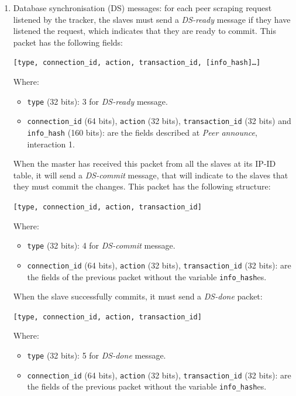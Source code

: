 \documentclass[twoside,a4paper,10pt]{article}
\begin{document}
\begin{itemize}
\begin{enumerate}
  \item Database synchronisation (DS) messages: for each peer scraping request
    listened by the tracker, the slaves must send a \emph{DS-ready} message
    if they have listened
    the request, which  indicates that they are ready to commit.
    This packet has the
    following fields:

    \texttt{[type, connection\_id, action, transaction\_id, [info\_hash]\ldots]}

    Where:
    \begin{itemize}
    \item \texttt{type} (32 bits): 3 for \emph{DS-ready} message.
    \item \texttt{connection\_id} (64 bits), \texttt{action} (32 bits),
      \texttt{transaction\_id} (32 bits) and \texttt{info\_hash} (160 bits):
      are the fields described at \emph{Peer announce}, interaction 1.
    \end{itemize}

    When the master has received this packet from all the slaves at its IP-ID
    table, it will send a \emph{DS-commit} message, that will indicate to
    the slaves that they must commit the changes. This packet has the following
    structure:

    \texttt{[type, connection\_id, action, transaction\_id]}

    Where:
    \begin{itemize}
    \item \texttt{type} (32 bits): 4 for \emph{DS-commit} message.
    \item \texttt{connection\_id} (64 bits), \texttt{action} (32 bits),
      \texttt{transaction\_id} (32 bits): are the fields of the previous packet
      without the variable \texttt{info\_hash}es.
    \end{itemize}

    When the slave successfully commits, it must send a \emph{DS-done} packet:
    
    \texttt{[type, connection\_id, action, transaction\_id]}

    Where:
    \begin{itemize}
    \item \texttt{type} (32 bits): 5 for \emph{DS-done} message.
    \item \texttt{connection\_id} (64 bits), \texttt{action} (32 bits),
      \texttt{transaction\_id} (32 bits): are the fields of the previous packet
      without the variable \texttt{info\_hash}es.
    \end{itemize}
    

\end{enumerate}
\end{itemize}
\end{document}
